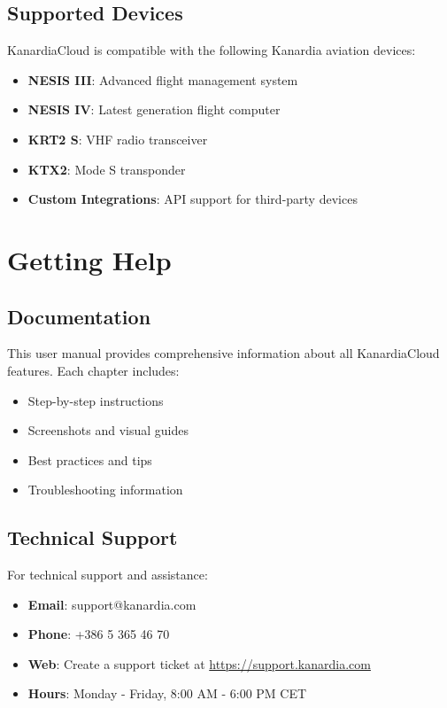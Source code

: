 \subsection{Supported Devices}

KanardiaCloud is compatible with the following Kanardia aviation devices:

\begin{itemize}
    \item \textbf{NESIS III}: Advanced flight management system
    \item \textbf{NESIS IV}: Latest generation flight computer
    \item \textbf{KRT2 S}: VHF radio transceiver
    \item \textbf{KTX2}: Mode S transponder
    \item \textbf{Custom Integrations}: API support for third-party devices
\end{itemize}

\section{Getting Help}

\subsection{Documentation}
This user manual provides comprehensive information about all KanardiaCloud features. Each chapter includes:
\begin{itemize}
    \item Step-by-step instructions
    \item Screenshots and visual guides
    \item Best practices and tips
    \item Troubleshooting information
\end{itemize}

\subsection{Technical Support}
For technical support and assistance:

\begin{itemize}
    \item \textbf{Email}: support@kanardia.com
    \item \textbf{Phone}: +386 5 365 46 70
    \item \textbf{Web}: Create a support ticket at \url{https://support.kanardia.com}
    \item \textbf{Hours}: Monday - Friday, 8:00 AM - 6:00 PM CET
\end{itemize}

